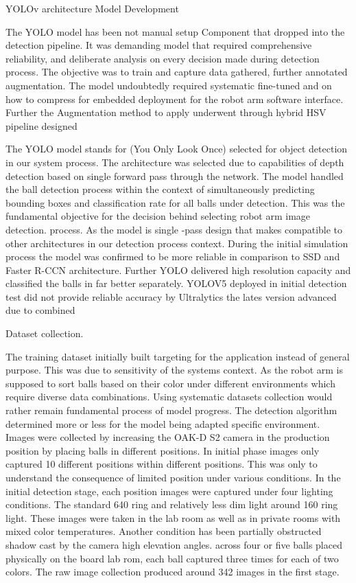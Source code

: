 YOLOv architecture Model Development 

The YOLO model has been not manual setup Component that dropped into the detection pipeline. It was demanding model that required comprehensive reliability, and deliberate analysis on every decision made during detection process. The objective was to train and capture data gathered, further annotated augmentation. The model undoubtedly required systematic fine-tuned and on how to compress for embedded deployment for the robot arm software interface. Further the Augmentation method to apply underwent through hybrid HSV pipeline designed 

The YOLO model stands for (You Only Look Once) selected for object detection in our system process. The architecture was selected due to capabilities of depth detection based on single forward pass through the network. The model handled the ball detection process within the context of simultaneously predicting bounding boxes and classification rate for all balls under detection. This was the fundamental objective for the decision behind selecting robot arm image detection. process. As the model is single -pass design that makes compatible to other architectures in our detection process context. During the initial simulation process the model was confirmed to be more reliable in comparison to SSD and Faster R-CCN architecture. Further YOLO delivered high resolution capacity and classified the balls in far better separately. YOLOV5 deployed in initial detection test did not provide reliable accuracy by Ultralytics the lates version advanced due to combined 

Dataset collection.

The training dataset initially built targeting for the application instead of general purpose. This was due to sensitivity of the systems context. As the robot arm is supposed to sort balls based on their color under different environments which require diverse data combinations. Using systematic datasets collection would rather remain fundamental process of model progress. The detection algorithm determined more or less for the model being adapted specific environment. Images were collected by increasing the OAK-D S2 camera in the production position by placing balls in different positions. In initial phase images only captured 10 different positions within different positions. This was only to understand the consequence of limited position under various conditions. In the initial detection stage, each position images were captured under four lighting conditions. The standard 640 ring and relatively less dim light around 160 ring light. These images were taken in the lab room as well as in private rooms with mixed color temperatures. Another condition has been partially obstructed shadow cast by the camera high elevation angles. across four or five balls placed physically on the board lab rom, each ball captured three times for each of two colors. The raw image collection produced around 342 images in the first stage. 

